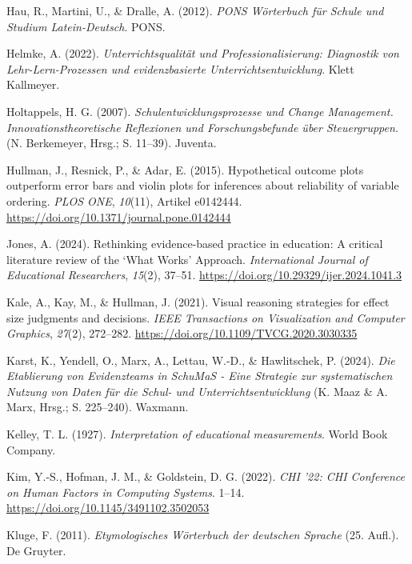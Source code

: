 \documentclass[
  man,
  floatsintext,
  longtable,
  nolmodern,
  notxfonts,
  notimes,
  colorlinks=true,linkcolor=blue,citecolor=blue,urlcolor=blue]{apa7}
\newlength{\cslhangindent}
\newenvironment{CSLReferences}[2] %
 {\begin{list}{}{%
  \setlength{\itemindent}{0pt}
  \setlength{\leftmargin}{0pt}
  \setlength{\parsep}{0pt}
  \ifodd #1
   \setlength{\leftmargin}{\cslhangindent}
   \setlength{\itemindent}{-1\cslhangindent}
  \fi
  \setlength{\itemsep}{#2\baselineskip}}}
 {\end{list}}
\begin{document}
\begin{CSLReferences}{1}{0}
Hau, R., Martini, U., \& Dralle, A. (2012). \emph{PONS Wörterbuch für
Schule und Studium Latein-Deutsch}. PONS.

Helmke, A. (2022). \emph{Unterrichtsqualität und Professionalisierung:
Diagnostik von Lehr-Lern-Prozessen und evidenzbasierte
Unterrichtsentwicklung}. Klett Kallmeyer.

Holtappels, H. G. (2007). \emph{Schulentwicklungsprozesse und Change
Management. Innovationstheoretische Reflexionen und Forschungsbefunde
über Steuergruppen.} (N. Berkemeyer, Hrsg.; S. 11--39). Juventa.

Hullman, J., Resnick, P., \& Adar, E. (2015). Hypothetical outcome plots
outperform error bars and violin plots for inferences about reliability
of variable ordering. \emph{PLOS ONE}, \emph{10}(11), Artikel e0142444.
\url{https://doi.org/10.1371/journal.pone.0142444}

Jones, A. (2024). Rethinking evidence-based practice in education: A
critical literature review of the {`}What Works{'} Approach.
\emph{International Journal of Educational Researchers}, \emph{15}(2),
37--51. \url{https://doi.org/10.29329/ijer.2024.1041.3}

Kale, A., Kay, M., \& Hullman, J. (2021). Visual reasoning strategies
for effect size judgments and decisions. \emph{IEEE Transactions on
Visualization and Computer Graphics}, \emph{27}(2), 272--282.
\url{https://doi.org/10.1109/TVCG.2020.3030335}

Karst, K., Yendell, O., Marx, A., Lettau, W.-D., \& Hawlitschek, P.
(2024). \emph{Die Etablierung von Evidenzteams in SchuMaS - Eine
Strategie zur systematischen Nutzung von Daten für die Schul- und
Unterrichtsentwicklung} (K. Maaz \& A. Marx, Hrsg.; S. 225--240).
Waxmann.

Kelley, T. L. (1927). \emph{Interpretation of educational measurements}.
World Book Company.

Kim, Y.-S., Hofman, J. M., \& Goldstein, D. G. (2022). \emph{CHI '22:
CHI Conference on Human Factors in Computing Systems}. 1--14.
\url{https://doi.org/10.1145/3491102.3502053}

Kluge, F. (2011). \emph{Etymologisches Wörterbuch der deutschen Sprache}
(25. Aufl.). De Gruyter.


\end{CSLReferences}
\end{document}
